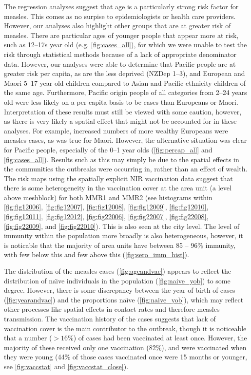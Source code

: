 \documentclass{article}
\begin{document}
The regression analyses suggest that age is a particularly strong risk factor for measles. This comes as no surpise to epidemiologists or health care providers. However, our analyses also highlight other groups that are at greater risk of measles. There are particular ages of younger people that appear more at risk, such as 12--17s year old (e.g. \autoref{fig:cases_all}), for which we were unable to test the risk through statistical methods because of a lack of appropriate denominator data. However, our analyses were able to determine that Pacific people are at greater risk per capita, as are the less deprived (NZDep 1--3), and European and Maori 5--17 year old children compared to Asian and Pacific ethnicity children of the same age. Furthermore, Pacific origin people of all categories from 2--24 years old were less likely on a per capita basis to be cases than Europeans or Maori. Interpretation of these results must still be viewed with some caution, however, as there is very likely a spatial effect that might not be accounted for in these analyses. For example, increased numbers of more wealthy Europeans were measles cases, as was true for Maori. However, the alternative situation was clear for Pacific people, especially of the 0--1 year olds (\autoref{fig:percap_all} and \autoref{fig:cases_all}). Results such as this may simply be due to the spatial effects in the communities the outbreaks were occurring in, rather than an effect of wealth. The risk maps using the spatially explicit NIR vaccination data suggest that there is some heterogeneity in the vaccination cover at the area unit (a level above meshblock) for both MMR1 and MMR2 (see histograms within \autoref{fig:fig12006}, \autoref{fig:fig12007}, \autoref{fig:fig12008}, \autoref{fig:fig12009}, \autoref{fig:fig12010}, \autoref{fig:fig12011}, \autoref{fig:fig12012}, \autoref{fig:fig22006}, \autoref{fig:fig22007}, \autoref{fig:fig22008}, \autoref{fig:fig22009}, and \autoref{fig:fig22010}). This is also seen at the city level. The level of immunity within the population more broadly is also heterogeneous, however, it is noticable that the majority of area units have between 85 -- 96\% immunity, with few below this and few above this (\autoref{fig:sero_imm_hist}).

The distribution of the measles cases (\autoref{fig:ageandvac}) appears to reflect the distribution of na\"{\i}ve individuals in the population (\autoref{fig:naive_yob}) to some degree. However, there is some discrepancy between the year of birth of cases (\autoref{fig:yearandvac}) and the proportions na\"{\i}ve (\autoref{fig:naive_yob}), which may reflect other processes like spatial effects in contact rates and therefore measles transmission. The vaccination history of the cases suggests that lack of vaccination cover is the main contributor to the outbreak, though it is noticeable that a number ($>16\%$) of cases had been vaccinated at least once. However, the majority of these received only one vaccination (82\%), and were vaccinated when they were young (44\% of those cases vaccinated once were 15 months or younger, see \autoref{fig:vaccstat} and \autoref{fig:vaccstat_close}).
\end{document}
